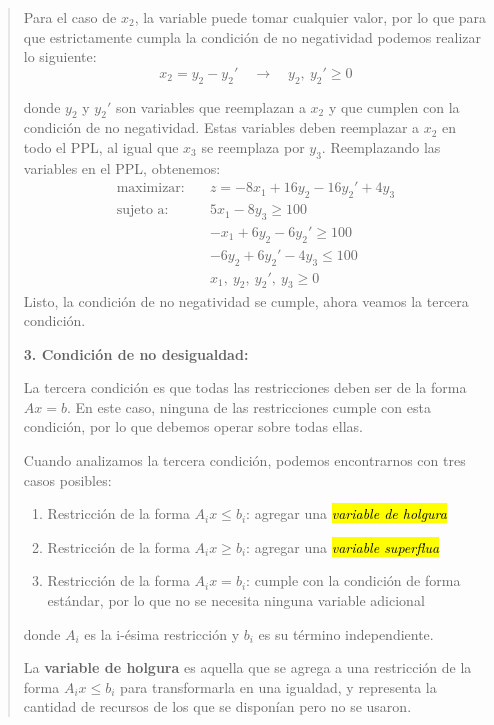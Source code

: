 \begin{quote}
  Para el caso de \(x_2\), la variable puede tomar cualquier valor, por lo que para que estrictamente cumpla la condición de no negatividad podemos realizar lo siguiente:
  \[
    x_2 = y_2 - y_2' \quad \rightarrow \quad y_2,\ y_2' \geq 0
  \]

  \noindent donde \(y_2\) y \(y_2'\) son variables que reemplazan a \(x_2\) y que cumplen con la condición de no negatividad. Estas variables deben reemplazar a \(x_2\) en todo el PPL, al igual que \(x_3\) se reemplaza por \(y_3\). Reemplazando las variables en el PPL, obtenemos:
  \begin{align*}
    \text{maximizar:} \quad   &z = -8x_1 + 16y_2 - 16y_2' + 4y_3 \\[3pt]
    \text{sujeto a:} \quad    &5x_1 - 8y_3 \geq 100 \\
                              &-x_1 + 6y_2 - 6y_2' \geq 100 \\
                              &-6y_2 + 6y_2' - 4y_3 \leq 100 \\
                              &x_1,\ y_2,\ y_2',\ y_3 \geq 0
  \end{align*}
  Listo, la condición de no negatividad se cumple, ahora veamos la tercera condición.

  \noindent\textbf{3. Condición de no desigualdad:}

  La tercera condición es que todas las restricciones deben ser de la forma \(Ax = b\). En este caso, ninguna de las restricciones cumple con esta condición, por lo que debemos operar sobre todas ellas. 

  Cuando analizamos la tercera condición, podemos encontrarnos con tres casos posibles:
  \begin{enumerate}
    \item Restricción de la forma \(A_i x \leq b_i\): agregar una \hl{\textit{variable de holgura}}
    \item Restricción de la forma \(A_i x \geq b_i\): agregar una \hl{\textit{variable superflua}}
    \item Restricción de la forma \(A_i x = b_i\): cumple con la condición de forma estándar, por lo que no se necesita ninguna variable adicional
  \end{enumerate}
  \noindent donde \(A_i\) es la i-ésima restricción y \(b_i\) es su término independiente.
  \begin{tcolorbox}[interesting_data, title=¿Qué significa variable de holgura?]
    La \textbf{variable de holgura} es aquella que se agrega a una restricción de la forma \(A_i x \leq b_i\) para transformarla en una igualdad, y representa la cantidad de recursos de los que se disponían pero no se usaron. 


\end{tcolorbox}
\end{quote}
